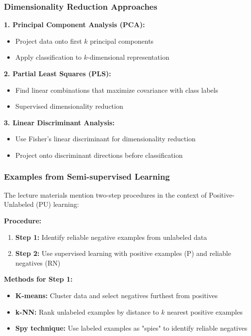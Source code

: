 \documentclass[12pt,a4paper]{article}
\begin{document}
\subsubsection{Dimensionality Reduction Approaches}

\textbf{1. Principal Component Analysis (PCA):}
\begin{itemize}
    \item Project data onto first $k$ principal components
    \item Apply classification to $k$-dimensional representation
\end{itemize}

\textbf{2. Partial Least Squares (PLS):}
\begin{itemize}
    \item Find linear combinations that maximize covariance with class labels
    \item Supervised dimensionality reduction
\end{itemize}

\textbf{3. Linear Discriminant Analysis:}
\begin{itemize}
    \item Use Fisher's linear discriminant for dimensionality reduction
    \item Project onto discriminant directions before classification
\end{itemize}

\subsubsection{Examples from Semi-supervised Learning}

The lecture materials mention two-step procedures in the context of Positive-Unlabeled (PU) learning:

\textbf{Procedure:}
\begin{enumerate}
    \item \textbf{Step 1:} Identify reliable negative examples from unlabeled data
    \item \textbf{Step 2:} Use supervised learning with positive examples (P) and reliable negatives (RN)
\end{enumerate}

\textbf{Methods for Step 1:}
\begin{itemize}
    \item \textbf{K-means:} Cluster data and select negatives furthest from positives
    \item \textbf{k-NN:} Rank unlabeled examples by distance to $k$ nearest positive examples
    \item \textbf{Spy technique:} Use labeled examples as "spies" to identify reliable negatives
\end{itemize}
\end{document}
